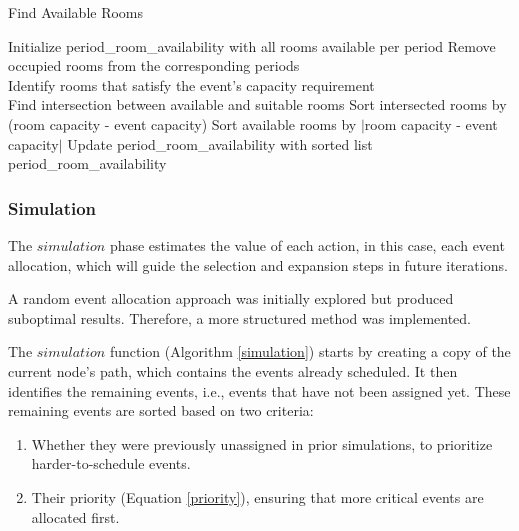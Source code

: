 \begin{algorithm}
\caption{Find Available Rooms}\label{find_available_rooms}
\begin{algorithmic}[1]
    \State Initialize period\_room\_availability with all rooms available per period
        \State Remove occupied rooms from the corresponding periods
    \EndFor
\\
    \State Identify rooms that satisfy the event's capacity requirement
\\
            \State Find intersection between available and suitable rooms
                \State Sort intersected rooms by (room capacity - event capacity)
            \Else
                \State Sort available rooms by $|$room capacity - event capacity$|$
            \EndIf
            \State Update period\_room\_availability with sorted list
        \EndIf
    \EndFor
\\
    \State \Return period\_room\_availability
\EndFunction
\end{algorithmic}
\end{algorithm}

\subsubsection{Simulation}

The \(simulation\) phase estimates the value of each action, in this case, each event allocation, which will guide the selection and expansion steps in future iterations. 

A random event allocation approach was initially explored but produced suboptimal results. Therefore, a more structured method was implemented.

The \(simulation\) function (Algorithm \ref{simulation}) starts by creating a copy of the current node's path, which contains the events already scheduled. It then identifies the remaining events, i.e., events that have not been assigned yet. These remaining events are sorted based on two criteria:
\begin{enumerate}
\item Whether they were previously unassigned in prior simulations, to prioritize harder-to-schedule events.
\item Their priority (Equation \ref{priority}), ensuring that more critical events are allocated first.
\end{enumerate}

